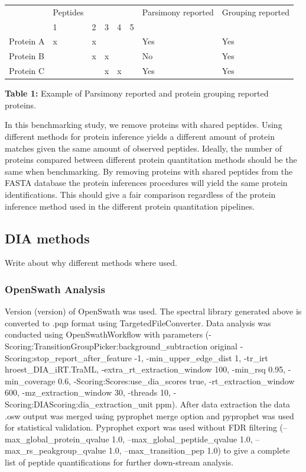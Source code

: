 \documentclass[10pt,letterpaper]{article}
\begin{document}
{\begin{table}[!htbp]
\begin{tabular}{llllllll}
          & Peptides &   &   &   &   & Parsimony reported & Grouping reported \\
          & 1        & 2 & 3 & 4 & 5 &                    &                   \\
Protein A & x        & x &   &   &   & Yes                & Yes               \\
Protein B &          & x & x &   &   & No                 & Yes               \\
Protein C &          &   & x & x &   & Yes                & Yes              	
\end{tabular}
\newline
\textbf{Table 1:} Example of Parsimony reported and protein grouping reported proteins.
\end{table}

In this benchmarking study, we remove proteins with shared peptides. Using different methods for protein inference yields a different amount of protein matches given the same amount of observed peptides. Ideally, the number of proteins compared between different protein quantitation methods should be the same when benchmarking. By removing proteins with shared peptides from the FASTA database the protein inferences procedures will yield the same protein identifications. This should give a fair comparison regardless of the protein inference method used in the different protein quantitation pipelines.

\subsection*{DIA methods}
Write about why different methods where used.

\subsubsection*{OpenSwath Analysis}
Version (version) of OpenSwath was used. The spectral library generated above is converted to .pqp format using TargetedFileConverter. Data analysis was conducted using OpenSwathWorkflow with parameters (-Scoring:TransitionGroupPicker:background\_subtraction original -Scoring:stop\_report\_after\_feature -1, -min\_upper\_edge\_dist 1, -tr\_irt hroest\_DIA\_iRT.TraML, -extra\_rt\_extraction\_window 100, -min\_rsq 0.95, -min\_coverage 0.6, -Scoring:Scores:use\_dia\_scores true, -rt\_extraction\_window 600, -mz\_extraction\_window 30, -threads 10, -Scoring:DIAScoring:dia\_extraction\_unit ppm). After data extraction the data .osw output was merged using pyprophet merge option and pyprophet was used for statistical validation. Pyprophet export was used without FDR filtering (--max\_global\_protein\_qvalue 1.0, --max\_global\_peptide\_qvalue 1.0, --max\_rs\_peakgroup\_qvalue 1.0, --max\_transition\_pep 1.0) to give a complete list of peptide quantifications for further down-stream analysis.

}
\end{document}
